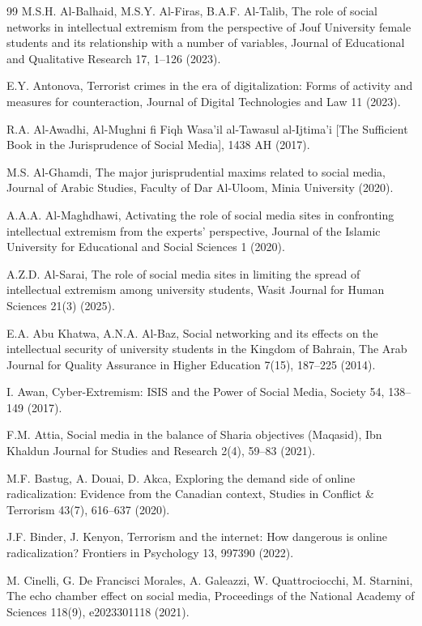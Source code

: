 \documentclass{NSP1}
\begin{document}
\begin{thebibliography}{99}
M.S.H. Al-Balhaid, M.S.Y. Al-Firas, B.A.F. Al-Talib, The role of social networks in intellectual extremism from the perspective of Jouf University female students and its relationship with a number of variables, Journal of Educational and Qualitative Research 17, 1–126 (2023).

E.Y. Antonova, Terrorist crimes in the era of digitalization: Forms of activity and measures for counteraction, Journal of Digital Technologies and Law 11 (2023).

R.A. Al-Awadhi, Al-Mughni fi Fiqh Wasa'il al-Tawasul al-Ijtima'i [The Sufficient Book in the Jurisprudence of Social Media], 1438 AH (2017).

M.S. Al-Ghamdi, The major jurisprudential maxims related to social media, Journal of Arabic Studies, Faculty of Dar Al-Uloom, Minia University (2020).

A.A.A. Al-Maghdhawi, Activating the role of social media sites in confronting intellectual extremism from the experts' perspective, Journal of the Islamic University for Educational and Social Sciences 1 (2020).

A.Z.D. Al-Sarai, The role of social media sites in limiting the spread of intellectual extremism among university students, Wasit Journal for Human Sciences 21(3) (2025).

E.A. Abu Khatwa, A.N.A. Al-Baz, Social networking and its effects on the intellectual security of university students in the Kingdom of Bahrain, The Arab Journal for Quality Assurance in Higher Education 7(15), 187–225 (2014).

I. Awan, Cyber-Extremism: ISIS and the Power of Social Media, Society 54, 138–149 (2017).

F.M. Attia, Social media in the balance of Sharia objectives (Maqasid), Ibn Khaldun Journal for Studies and Research 2(4), 59–83 (2021).

M.F. Bastug, A. Douai, D. Akca, Exploring the demand side of online radicalization: Evidence from the Canadian context, Studies in Conflict \& Terrorism 43(7), 616–637 (2020).

J.F. Binder, J. Kenyon, Terrorism and the internet: How dangerous is online radicalization? Frontiers in Psychology 13, 997390 (2022).

M. Cinelli, G. De Francisci Morales, A. Galeazzi, W. Quattrociocchi, M. Starnini, The echo chamber effect on social media, Proceedings of the National Academy of Sciences 118(9), e2023301118 (2021).


\end{thebibliography}
\end{document}
